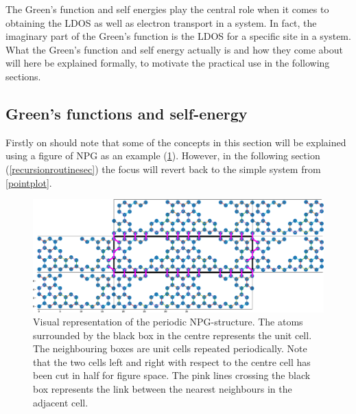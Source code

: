 The Green's function and self energies play the central role when it comes to obtaining the LDOS as well as electron transport in a system. In fact, the imaginary part of the Green's function is the LDOS for a specific site in a system. What the Green's function and self energy actually is and how they come about will here be explained formally, to motivate the practical use in the following sections.\subsection{Green's functions and self-energy}\label{greensandself}
Firstly on should note that some of the concepts in this section will be explained using a figure of NPG as an example (\cref{atomrepfig}). However, in the following section (\cref{recursionroutinesec}) the focus will revert back to the simple system from \cref{pointplot}. \begin{figure}[H]
	\centering
	\includegraphics[width=\textwidth]{Figures/representativestructure2.eps}
	\caption{Visual representation of the periodic NPG-structure. The atoms surrounded by the black box in the centre represents the unit cell. The neighbouring boxes are unit cells repeated periodically. Note that the two cells left and right with respect to the centre cell has been cut in half for figure space. The pink lines crossing the black box represents the link between the nearest neighbours in the adjacent cell.}
	\label{atomrepfig}
\end{figure}
